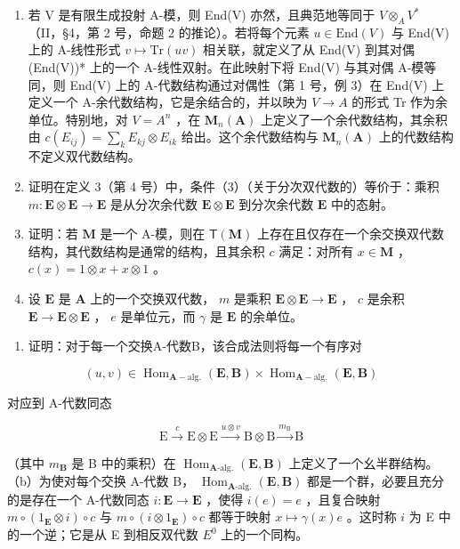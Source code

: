\begin{enumerate}
\def\labelenumi{\arabic{enumi}.}
\item
  若 V 是有限生成投射 A-模，则 End(V) 亦然，且典范地等同于 \(V \otimes_{A} V^{*}\) （II，§4，第 2 号，命题 2 的推论）。若将每个元素 \(u \in \text{End}(V)\) 与 End(V) 上的 A-线性形式 \(v \mapsto \text{Tr}(uv)\) 相关联，就定义了从 End(V) 到其对偶 (End(V))* 上的一个 A-线性双射。在此映射下将 End(V) 与其对偶 A-模等同，则 End(V) 上的 A-代数结构通过对偶性（第 1 号，例 3）在 End(V) 上定义一个 A-余代数结构，它是余结合的，并以映为 \(V \to A\) 的形式 Tr 作为余单位。特别地，对 \(V = A^{n}\) ，在 \(\mathbf{M}_{n}(\mathbf{A})\) 上定义了一个余代数结构，其余积由 \(c(E_{ij}) = \sum_{k} E_{kj} \otimes E_{ik}\) 给出。这个余代数结构与 \(\mathbf{M}_{n}(\mathbf{A})\) 上的代数结构不定义双代数结构。
\item
  证明在定义 3（第 4 号）中，条件（3）（关于分次双代数的）等价于：乘积 \(m: \mathbf{E} \otimes \mathbf{E} \to \mathbf{E}\) 是从分次余代数 \(\mathbf{E} \otimes \mathbf{E}\) 到分次余代数 \(\mathbf{E}\) 中的态射。
\item
  证明：若 \(\mathbf{M}\) 是一个 A-模，则在 \(\mathsf{T}(\mathbf{M})\) 上存在且仅存在一个余交换双代数结构，其代数结构是通常的结构，且其余积 \(c\) 满足：对所有 \(x\in \mathbf{M}\) ， \(c(x) = 1\otimes x + x\otimes 1\) 。
\item
  设 \(\mathbf{E}\) 是 \(\mathbf{A}\) 上的一个交换双代数， \(m\) 是乘积 \(\mathbf{E} \otimes \mathbf{E} \to \mathbf{E}\) ， \(c\) 是余积 \(\mathbf{E} \to \mathbf{E} \otimes \mathbf{E}\) ， \(e\) 是单位元，而 \(\gamma\) 是 \(\mathbf{E}\) 的余单位。
\end{enumerate}

\begin{enumerate}
\def\labelenumi{(\alph{enumi})}
\tightlist
\item
  证明：对于每一个交换A-代数B，该合成法则将每一个有序对
\end{enumerate}

\[
(u, v) \in \operatorname{Hom} _ {\mathbf {A} - \mathrm{alg.}} (\mathbf {E}, \mathbf {B}) \times \operatorname{Hom} _ {\mathbf {A} - \mathrm{alg.}} (\mathbf {E}, \mathbf {B})
\]

对应到 A-代数同态

\[
\mathrm{E} \xrightarrow {c} \mathrm{E} \otimes \mathrm{E} \xrightarrow {u \otimes v} \mathrm{B} \otimes \mathrm{B} \xrightarrow {m _ {\mathrm{B}}} \mathrm{B}
\]

（其中 \(m_{\mathbf{B}}\) 是 B 中的乘积）在 \(\operatorname{Hom}_{\mathbf{A}\text{-alg.}}(\mathbf{E}, \mathbf{B})\) 上定义了一个幺半群结构。（b）为使对每个交换 A-代数 B， \(\operatorname{Hom}_{\mathbf{A}\text{-alg.}}(\mathbf{E}, \mathbf{B})\) 都是一个群，必要且充分的是存在一个 A-代数同态 \(i: \mathbf{E} \to \mathbf{E}\) ，使得 \(i(e) = e\) ，且复合映射 \(m \circ (1_{\mathbf{E}} \otimes i) \circ c\) 与 \(m \circ (i \otimes 1_{\mathbf{E}}) \circ c\) 都等于映射 \(x \mapsto \gamma(x)e\) 。这时称 \(i\) 为 E 中的一个逆；它是从 E 到相反双代数 \(E^0\) 上的一个同构。


